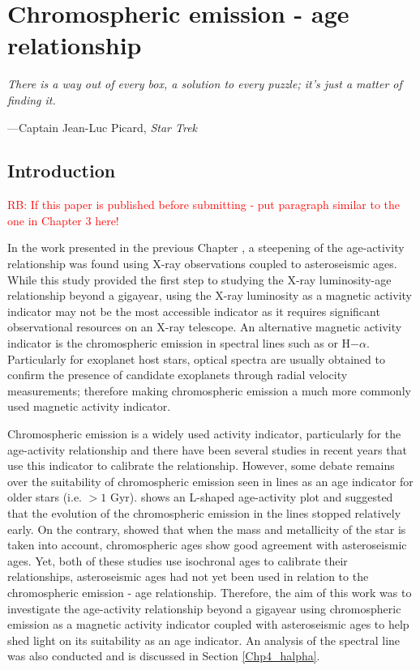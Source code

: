 
\chapter{Chromospheric emission - age relationship} %

\label{Chapter4} %

\epigraph{\itshape There is a way out of every box, a solution to every puzzle; it's just a matter of finding it.}{---Captain Jean-Luc Picard, \itshape Star Trek}

\section{Introduction}
\textcolor{red}{RB: If this paper is published before submitting - put paragraph similar to the one in Chapter 3 here!}

In the work presented in the previous Chapter \citep{Booth_etal_2017}, a steepening of the age-activity relationship was found using X-ray observations coupled to asteroseismic ages. While this study provided the first step to studying the X-ray luminosity-age relationship beyond a gigayear, using the X-ray luminosity as a magnetic activity indicator may not be the most accessible indicator as it requires significant observational resources on an X-ray telescope. An alternative magnetic activity indicator is the chromospheric emission in spectral lines such as \caII or H$-\alpha$. Particularly for exoplanet host stars, optical spectra are usually obtained to confirm the presence of candidate exoplanets through radial velocity measurements; therefore making chromospheric emission a much more commonly used magnetic activity indicator.

Chromospheric emission is a widely used activity indicator, particularly for the age-activity relationship and there have been several studies in recent years that use this indicator to calibrate the relationship. However, some debate remains over the suitability of chromospheric emission seen in \caII lines as an age indicator for older stars (i.e. $> 1$ Gyr). \citet{Pace_2013} shows an L-shaped age-activity plot and suggested that the evolution of the chromospheric emission in the \caII lines stopped relatively early. On the contrary, \citet{Lorenzo_Oliveira_etal_2016} showed that when the mass and metallicity of the star is taken into account, chromospheric ages show good agreement with asteroseismic ages. Yet, both of these studies use isochronal ages to calibrate their relationships, asteroseismic ages had not yet been used in relation to the chromospheric emission - age relationship. Therefore, the aim of this work was to investigate the age-activity relationship beyond a gigayear using chromospheric emission as a magnetic activity indicator coupled with asteroseismic ages to help shed light on its suitability as an age indicator. An analysis of the \Halpha spectral line was also conducted and is discussed in Section \ref{Chp4_halpha}.

